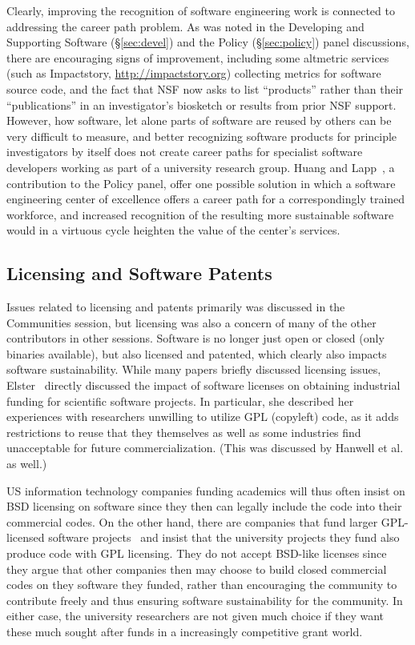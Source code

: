 \documentclass[11pt, oneside]{amsart}
\begin{document}
Clearly, improving the recognition of software engineering work is
connected to addressing the career path problem. As was noted in the
Developing and Supporting Software (\S\ref{sec:devel}) and the Policy
(\S\ref{sec:policy}) panel discussions, there are encouraging signs of
improvement, including some altmetric services (such as Impactstory,
\url{http://impactstory.org}) collecting metrics for software source
code, and the fact that NSF now asks to list ``products'' rather than
their ``publications'' in an investigator's biosketch or results from
prior NSF support. However, how software, let alone parts of software
are reused by others can be very difficult to measure, and better
recognizing software products for principle investigators by itself
does not create career paths for specialist software developers
working as part of a university research group. Huang and
Lapp~\cite{Huang_WSSSPE}, a contribution to the Policy panel, offer
one possible solution in which a software engineering center of
excellence offers a career path for a correspondingly trained
workforce, and increased recognition of the resulting more sustainable
software would in a virtuous cycle heighten the value of the center's
services.

\subsection{Licensing and Software Patents}
Issues related to licensing and patents primarily was discussed in the Communities
session, but licensing was also a concern of many of the other contributors
in other sessions.
%
Software is no longer just open or closed (only binaries available),
but also licensed and patented, which clearly also impacts 
software sustainability.
While many papers briefly discussed licensing issues,
Elster~\cite{Elster_WSSSPE} directly discussed the impact of software licenses 
on obtaining industrial funding for scientific software
projects.  In particular, she described her experiences with researchers
unwilling to utilize GPL (copyleft) code, as it adds restrictions to
reuse that they themselves as well as some industries find unacceptable for future
commercialization.  (This was discussed by Hanwell et
al.~\cite{Hanwell_WSSSPE} as well.)

US information technology companies funding 
academics will thus often insist on BSD licensing on software 
since they then can legally include the code into their commercial
codes.
%
On the other hand, there are companies
that fund larger GPL-licensed software projects~\cite{Blatt_WSSSPE}
and insist that the university projects they fund 
also produce code with GPL licensing.
They do not accept BSD-like licenses since they argue that
other companies then may choose to build closed commercial
codes on they software they funded, rather than encouraging 
the community to contribute freely and thus ensuring software 
sustainability for the community.
%
In either case, the university researchers are not given much choice
if they want these much sought after funds in a increasingly competitive
grant world.
\end{document}

